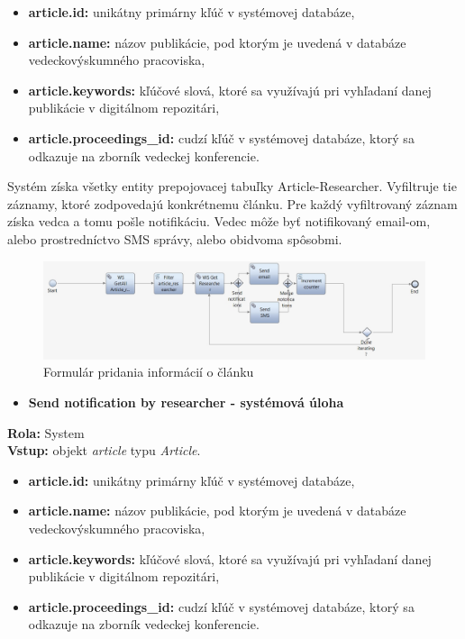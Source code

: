 \documentclass[10pt,oneside,slovak,a4paper]{article}
\begin{document}
\begin{itemize}
\item \textbf{article.id:} unikátny primárny kľúč v systémovej databáze,
\item \textbf{article.name:} názov publikácie, pod ktorým je uvedená v databáze vedeckovýskumného pracoviska,
\item \textbf{article.keywords:} kľúčové slová, ktoré sa využívajú pri vyhľadaní danej publikácie v digitálnom repozitári,
\item \textbf{article.proceedings\_id:} cudzí kľúč v systémovej databáze, ktorý sa odkazuje na zborník vedeckej konferencie.
\end{itemize}

Systém získa všetky entity prepojovacej tabuľky Article-Researcher. Vyfiltruje tie záznamy, ktoré zodpovedajú konkrétnemu článku. Pre každý vyfiltrovaný záznam získa vedca a tomu pošle notifikáciu. Vedec môže byť notifikovaný email-om, alebo prostredníctvo SMS správy, alebo obidvoma spôsobmi.

\begin{figure} [H]
\centering
\includegraphics[scale=0.4]{diagrams/diagNotification.jpg} 
\caption{Formulár pridania informácií o článku}
\end{figure}

\begin{itemize}
\item \textbf{Send notification by researcher - systémová úloha}
\end{itemize}

\textbf{Rola:} System\\
\textbf{Vstup:} objekt \textit{article} typu \textit{Article}.

\begin{itemize}
\item \textbf{article.id:} unikátny primárny kľúč v systémovej databáze,
\item \textbf{article.name:} názov publikácie, pod ktorým je uvedená v databáze vedeckovýskumného pracoviska,
\item \textbf{article.keywords:} kľúčové slová, ktoré sa využívajú pri vyhľadaní danej publikácie v digitálnom repozitári,
\item \textbf{article.proceedings\_id:} cudzí kľúč v systémovej databáze, ktorý sa odkazuje na zborník vedeckej konferencie.
\end{itemize}
\end{document}
